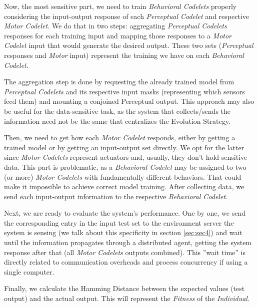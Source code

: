Now, the most sensitive part, we need to train \emph{Behavioral Codelets} properly considering the input-output response of each \emph{Perceptual Codelet} and respective \emph{Motor Codelet}. We do that in two steps: aggregating \emph{Perceptual Codelets} responses for each training input and mapping those responses to a \emph{Motor Codelet} input that would generate the desired output. These two sets (\emph{Perceptual} responses and \emph{Motor} input) represent the training we have on each \emph{Behavioral Codelet}.

The aggregation step is done by requesting the already trained model from \emph{Perceptual Codelets} and its respective input masks (representing which sensors feed them) and mounting a conjoined Perceptual output. This approach may also be useful for the data-sensitive task, as the system that collects/sends the information need not be the same that centralizes the Evolution Strategy.

Then, we need to get how each \emph{Motor Codelet} responds, either by getting a trained model or by getting an input-output set directly. We opt for the latter since \emph{Motor Codelets} represent actuators and, usually, they don't hold sensitive data. This part is problematic, as a \emph{Behavioral Codelet} may be assigned to two (or more) \emph{Motor Codelets} with fundamentally different behaviors. That could make it impossible to achieve correct model training. After collecting data, we send each input-output information to the respective \emph{Behavioral Codelet}.


Next, we are ready to evaluate the system's performance. One by one, we send the corresponding entry in the input test set to the environment server the system is sensing (we talk about this specificity in section \ref{sec:sec4}) and wait until the information propagates through a distributed agent, getting the system response after that (all \emph{Motor Codelets} outputs combined). This ''wait time'' is directly related to communication overheads and process concurrency if using a single computer.

Finally, we calculate the Hamming Distance between the expected values (test output) and the actual output. This will represent the \emph{Fitness} of the \emph{Individual}.




